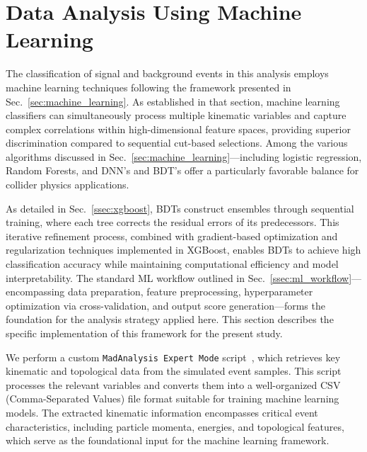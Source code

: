 
\section{Data Analysis Using Machine Learning}\label{sec:ML}
The classification of signal and background events in this analysis employs machine learning techniques following the framework presented in Sec.~\ref{sec:machine_learning}. As established in that section, machine learning classifiers can simultaneously process multiple kinematic variables and capture complex correlations within high-dimensional feature spaces, providing superior discrimination compared to sequential cut-based selections. Among the various algorithms discussed in Sec.~\ref{sec:machine_learning}—including logistic regression, Random Forests, and DNN's and BDT's offer a particularly favorable balance for collider physics applications.

As detailed in Sec.~\ref{ssec:xgboost}, BDTs construct ensembles through sequential training, where each tree corrects the residual errors of its predecessors. This iterative refinement process, combined with gradient-based optimization and regularization techniques implemented in XGBoost, enables BDTs to achieve high classification accuracy while maintaining computational efficiency and model interpretability. The standard ML workflow outlined in Sec.~\ref{ssec:ml_workflow}—encompassing data preparation, feature preprocessing, hyperparameter optimization via cross-validation, and output score generation—forms the foundation for the analysis strategy applied here. This section describes the specific implementation of this framework for the present study. 

We perform a custom \texttt{MadAnalysis Expert Mode} script~\parencite{CONTE2013222}, which retrieves key kinematic and topological data from the simulated event samples. This script processes the relevant variables and converts them into a well-organized CSV (Comma-Separated Values) file format suitable for training machine learning models. The extracted kinematic information encompasses critical event characteristics, including particle momenta, energies, and topological features, which serve as the foundational input for the machine learning framework. 

